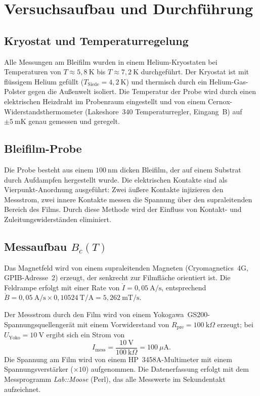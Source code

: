 \section{Versuchsaufbau und Durchführung}
\label{sec:aufbau}

\subsection{Kryostat und Temperaturregelung}

Alle Messungen am Bleifilm wurden in einem Helium-Kryostaten bei Temperaturen von $T \approx 5{,}8~\mathrm{K}$ bis $T \approx 7{,}2~\mathrm{K}$ durchgeführt.
Der Kryostat ist mit flüssigem Helium gefüllt ($T_\mathrm{Siede} = 4{,}2~\mathrm{K}$) und thermisch durch ein Helium-Gas-Polster gegen die Außenwelt isoliert.
Die Temperatur der Probe wird durch einen elektrischen Heizdraht im Probenraum eingestellt und von einem Cernox-Widerstandsthermometer (Lakeshore~340 Temperatur\-regler, Eingang~B) auf $\pm 5~\mathrm{mK}$ genau gemessen und geregelt.

\subsection{Bleifilm-Probe}

Die Probe besteht aus einem $100~\mathrm{nm}$ dicken Bleifilm, der auf einem Substrat durch Aufdampfen hergestellt wurde.
Die elektrischen Kontakte sind als Vierpunkt-Anordnung ausgeführt: Zwei äußere Kontakte injizieren den Messstrom, zwei innere Kontakte messen die Spannung über den supraleitenden Bereich des Films.
Durch diese Methode wird der Einfluss von Kontakt- und Zuleitungswiderständen eliminiert.

\subsection{Messaufbau $B_c(T)$}

Das Magnetfeld wird von einem supraleitenden Magneten (Cryomagnetics~4G, GPIB-Adresse~2) erzeugt, der senkrecht zur Filmfläche orientiert ist.
Die Feldrampe erfolgt mit einer Rate von $\dot{I} = 0{,}05~\mathrm{A/s}$, entsprechend $\dot{B} = 0{,}05~\mathrm{A/s} \times 0{,}10524~\mathrm{T/A} = 5{,}262~\mathrm{mT/s}$.

Der Messstrom durch den Film wird von einem Yokogawa~GS200-Spannungsquellengerät mit einem Vorwiderstand von $R_\mathrm{pre} = 100~\mathrm{k}\Omega$ erzeugt; bei $U_\mathrm{Yoko} = 10~\mathrm{V}$ ergibt sich ein Strom von
\begin{equation}
    I_\mathrm{mess} = \frac{10~\mathrm{V}}{100~\mathrm{k}\Omega} = 100~\mu\mathrm{A}.
\end{equation}
Die Spannung am Film wird von einem HP~3458A-Multimeter mit einem Spannungsverstärker ($\times 10$) aufgenommen.
Die Datenerfassung erfolgt mit dem Messprogramm \textit{Lab::Moose} (Perl), das alle Messwerte im Sekundentakt aufzeichnet.


